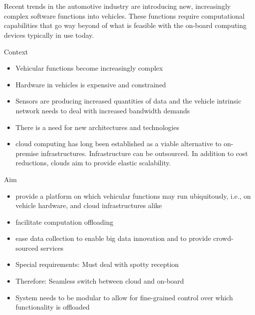\chapter{\abstractname}

Recent trends in the automotive industry are introducing new, increasingly complex software functions into vehicles. These functions require computational capabilities that go way beyond of what is feasible with the on-board computing devices typically in use today.

Context
\begin{itemize}
\item Vehicular functions become increasingly complex
\item Hardware in vehicles is expensive and constrained
\item Sensors are producing increased quantities of data and the vehicle intrinsic network needs to deal with increased bandwidth demands
\item There is a need for new architectures and technologies
\item cloud computing has long been established as a viable alternative to on-premise infrastructures. Infrastructure can be outsourced. In addition to cost reductions, clouds aim to provide elastic scalability.
\end{itemize}

Aim
\begin{itemize}
\item provide a platform on which vehicular functions may run ubiquitously, i.e., on vehicle hardware, and cloud infrastructures alike
\item facilitate computation offloading
\item ease data collection to enable big data innovation and to provide crowd-sourced services
\item Special requirements: Must deal with spotty reception
\item Therefore: Seamless switch between cloud and on-board
\item System needs to be modular to allow for fine-grained control over which functionality is offloaded
\end{itemize}

